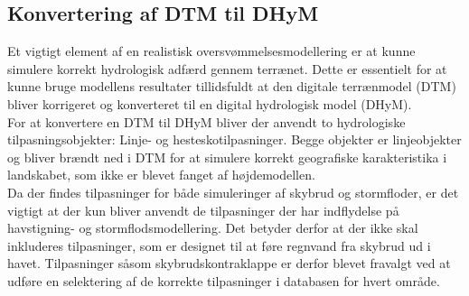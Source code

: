 
\subsection{Konvertering af DTM til DHyM} \label{Sektion: Konvertering af DTM til DHyM}
Et vigtigt element af en realistisk oversvømmelsesmodellering er at kunne simulere korrekt hydrologisk adfærd gennem terrænet. Dette er essentielt for at kunne bruge modellens resultater tillidsfuldt at den digitale terrænmodel (DTM) bliver korrigeret og konverteret til en digital hydrologisk model (DHyM).\\ 

For at konvertere en DTM til DHyM bliver der anvendt to hydrologiske tilpasningsobjekter: Linje- og hesteskotilpasninger. Begge objekter er linjeobjekter og bliver brændt ned i DTM for at simulere korrekt geografiske karakteristika i landskabet, som ikke er blevet fanget af højdemodellen. \\
Da der findes tilpasninger for både simuleringer af skybrud og stormfloder, er det vigtigt at der kun bliver anvendt de tilpasninger der har indflydelse på havstigning- og stormflodsmodellering. Det betyder derfor at der ikke skal inkluderes tilpasninger, som er designet til at føre regnvand fra skybrud ud i havet. Tilpasninger såsom skybrudskontraklappe er derfor blevet fravalgt ved at udføre en selektering af de korrekte tilpasninger i databasen for hvert område.\\

